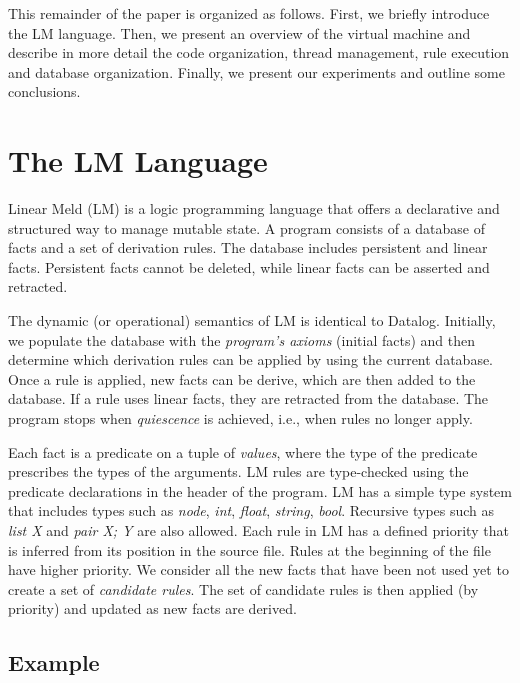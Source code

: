 \documentclass{sigplanconf}
\newcommand{\lolli}{\multimap}
\begin{document}
This remainder of the paper is organized as follows. First, we briefly
introduce the LM language. Then, we present an overview of the virtual
machine and describe in more detail the code organization, thread
management, rule execution and database organization. Finally, we
present our experiments and outline some conclusions.
 
\makeatletter{}\newcommand{\selector}[0]{[~S~\Rightarrow~y;~BE~] \lolli HE}
\newcommand{\comprehension}[0]{\{~\widehat{x};~BE;~SH~\}}
\newcommand{\aggregate}[0]{[~A~\Rightarrow~y;~\widehat{x};~BE;~SH_1;~SH_2~]}


\section{The LM Language}
\label{lm_language}

Linear Meld (LM) is a logic programming language that offers a
declarative and structured way to manage mutable state.  A program consists of
a database of facts and a set of derivation rules. The database
includes persistent and linear facts. Persistent facts cannot be
deleted, while linear facts can be asserted and retracted.

The dynamic (or operational) semantics of LM is identical to
Datalog. Initially, we populate the database with the \emph{program's axioms} (initial facts)
and then determine which derivation rules can be applied by
using the current database. Once a rule is applied, new facts can be
derive, which are then added to the database. If a rule uses linear
facts, they are retracted from the database. The program stops when
\emph{quiescence} is achieved, i.e., when rules no longer apply.

Each fact is a predicate on a tuple of \emph{values}, where the type
of the predicate prescribes the types of the arguments.  LM rules are
type-checked using the predicate declarations in the header of the
program. LM has a simple type system that includes types such as
\emph{node}, \emph{int}, \emph{float}, \emph{string},
\emph{bool}. Recursive types such as \emph{list X} and \emph{pair X;
  Y} are also allowed.  Each rule in LM has a defined priority that is
inferred from its position in the source file.  Rules at the beginning
of the file have higher priority.
We consider all the new facts that have been not used yet to create a
set of \emph{candidate rules}.
The set of candidate rules is then applied (by priority)
and updated as new facts are derived.


\subsection{Example}
\end{document}

